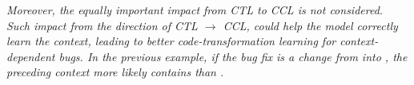 


{\em Moreover, the equally important impact from CTL to CCL is not
  considered. Such impact from the direction of CTL $\rightarrow$
CCL, could help the model correctly learn the context, leading to
better code-transformation learning for context-dependent bugs. In the
previous example, if the bug fix is a change from  into , the preceding context more
likely contains  than .}

